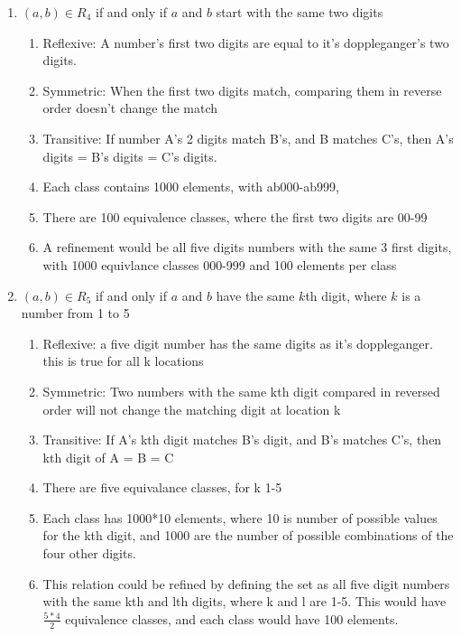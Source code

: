\begin{enumerate}
\begin{enumerate}
            \item $(a,b) \in R_4$ if and only if $a$ and $b$ start with the same two digits \\
                \begin{enumerate}
                    \item Reflexive: A number's first two digits are equal to it's doppleganger's two digits.
                    \item Symmetric: When the first two digits match, comparing them in reverse order doesn't change the match
                    \item Transitive: If number A's 2 digits match B's, and B matches C's, then A's digits = B's digits = C's digits.
                    \item Each class contains 1000 elements, with ab000-ab999,
                    \item There are 100 equivalence classes, where the first two digits are 00-99
                    \item A refinement would be all five digits numbers with the same 3 first digits, with 1000 equivlance classes 000-999 and 100 elements per class
                \end{enumerate}
            \item $(a,b) \in R_5$ if and only if $a$ and $b$ have the same $k$th digit, where $k$ is a number from 1 to 5
                \begin{enumerate}
                    \item Reflexive: a five digit number has the same digits as it's doppleganger. this is true for all k locations
                    \item Symmetric: Two numbers with the same kth digit compared in reversed order will not change the matching digit at location k
                    \item Transitive: If A's kth digit matches B's digit, and B's matches C's, then kth digit of A = B = C
                    \item There are five equivalance classes, for k 1-5
                    \item Each class has 1000*10 elements, where 10 is number of possible values for the kth digit, and 1000 are the number of possible combinations of the four other digits.
                    \item This relation could be refined by defining the set as all five digit numbers with the same kth and lth digits, where k and l are 1-5. This would have $\frac{5*4}{2}$ equivalence classes, and each class would have 100 elements.
                \end{enumerate}
        \end{enumerate}


\end{enumerate}
